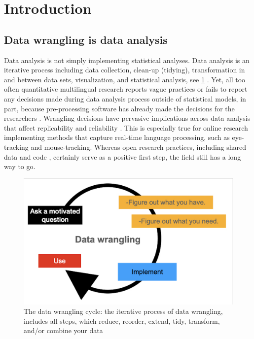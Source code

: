 \section{Introduction}
\subsection{Data wrangling is data analysis}

Data analysis is not simply implementing statistical analyses. Data analysis is an iterative process including data collection, clean-up (tidying), transformation in and between data sets,  visualization, and statistical analysis, see \ref{fig:data_wrangling} \parencite{Wickham2017R}. Yet, all too often quantitative multilingual research reports vague practices or fails to report any decisions made during data analysis process outside of statistical models, in part, because pre-processing software has already made the decisions for the researchers \parencite{Prystauka_Altmann_Rothman_2023}. Wrangling decisions have pervasive implications across data analysis that affect replicability and reliability \parencite{ana_flex}. This is especially true for online research implementing methods that capture real-time language processing, such as eye-tracking and mouse-tracking. Whereas open research practices, including shared data and code \parencite{Bolibaugh}, certainly serve as a positive first step, the field still has a long way to go. 

\begin{figure}[h]
    \centering
    \includegraphics[width=\textwidth]{figures/data_wrangling.png}
    \caption{The data wrangling cycle: the iterative process of data wrangling, includes all steps, which reduce, reorder, extend, tidy, transform, and/or combine your data}
    \label{fig:data_wrangling}
\end{figure}

